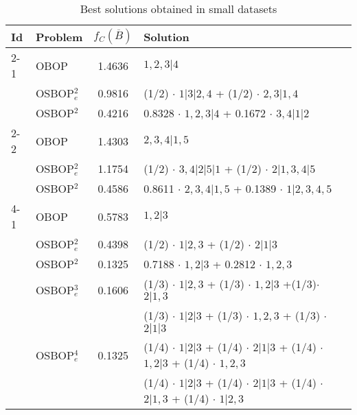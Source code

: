 \documentclass[preprint,12pt]{article}
\theoremstyle{definition}
\theoremstyle{remark}
\theoremstyle{example} %
\begin{document}
\begin{table}
\begin{footnotesize}
\centering
\caption{\label{tab:BestSolutionsSmall}Best solutions obtained in small datasets}
\renewcommand{\arraystretch}{1.2} %
\smallskip
\begin{tabular}{llcl}\hline
Id	&	Problem &   $f_C(\overline{B})$    & Solution	\\  \hline
2-1	&	OBOP        &   1.4636  & $1,2,3|4$	\\ \cline{2-4}  
    &   OSBOP$^2_e$ &   0.9816  & (1/2) $\cdot$ $1|3|2,4$ + (1/2) $\cdot$ $2,3|1,4$ \\
     \cline{2-4}
    &   OSBOP$^2$   &   0.4216  & 0.8328 $\cdot$ $1,2,3|4$ + 0.1672 $\cdot$ $3,4|1|2$  \\
     \hline
2-2	&	OBOP        &   1.4303  & $2,3,4|1,5$	\\  \cline{2-4}
    &   OSBOP$^2_e$ &   1.1754  & (1/2) $\cdot$ $3,4|2|5|1$ + (1/2) $\cdot$ $2|1,3,4|5$ \\
    \cline{2-4}
    &   OSBOP$^2$   &   0.4586  &  0.8611 $\cdot$ $2,3,4|1,5$ + 0.1389 $\cdot$ $1|2,3,4,5$  \\
    \hline
4-1	&	OBOP        &   0.5783  & $1,2|3$	\\  \cline{2-4}
    &   OSBOP$^2_e$ &   0.4398  & (1/2) $\cdot$ $1|2,3$ + (1/2) $\cdot$ $2|1|3$ \\
    \cline{2-4}
    &   OSBOP$^2$   &   0.1325  & 0.7188 $\cdot$ $1,2|3$ + 0.2812 $\cdot$ $1,2,3$   \\
    \cline{2-4}
    &   OSBOP$^3_e$   &    0.1606       & (1/3) $\cdot$ $1|2,3$ + (1/3) $\cdot$ $1,2|3$ +(1/3)$\cdot$ $2|1,3$ 
    \\ \cline{4-4}    
    &  &     & (1/3) $\cdot$ $1|2|3$ + (1/3) $\cdot$ $1,2,3$ + (1/3) $\cdot$ $2|1|3$ \\ \cline{2-4}
    &   OSBOP$^4_e$ &   0.1325  & 
   
    (1/4) $\cdot$ $1|2|3$ + 
    (1/4) $\cdot$ $2|1|3$ + 
    (1/4) $\cdot$ $1,2|3$ + 
    (1/4) $\cdot$ $1,2,3$    \\ \cline{4-4}
    &   &     & 
   
    (1/4) $\cdot$ $1|2|3$ + 
    (1/4) $\cdot$ $2|1|3$ + 
    (1/4) $\cdot$ $2|1,3$ + 
    (1/4) $\cdot$ $1|2,3$      


\end{tabular}
\end{footnotesize}
\end{table}
\end{document}
